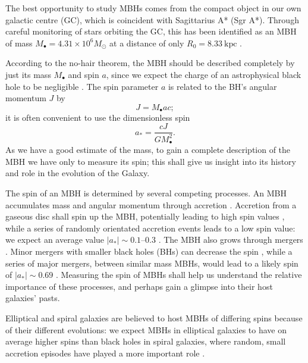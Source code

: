 \documentclass[useAMS,usedcolumn,usegraphicx,usenatbib]{mn2e}
\newcommand{\units}[1]{\ensuremath{~\mathrm{#1}}}
\begin{document}
The best opportunity to study MBHs comes from the compact object in our own galactic centre (GC), which is coincident with Sagittarius A* (Sgr A*). Through careful monitoring of stars orbiting the GC, this has been identified as an MBH of mass $M_\bullet = 4.31 \times 10^6 M_\odot$ at a distance of only $R_0 = 8.33\units{kpc}$ \citep{Gillessen2009}.

According to the no-hair theorem, the MBH should be described completely by just its mass $M_\bullet$ and spin $a$, since we expect the charge of an astrophysical black hole to be negligible \citep{Israel1967, Israel1968, Carter1971, Hawking1972, Robinson1975, Chandrasekhar1998}. The spin parameter $a$ is related to the BH's angular momentum $J$ by
\begin{equation}
J = M_\bullet ac;
\end{equation}
it is often convenient to use the dimensionless spin
\begin{equation}
a_\ast = \frac{cJ}{GM_\bullet^2}.
\end{equation}
As we have a good estimate of the mass, to gain a complete description of the MBH we have only to measure its spin; this shall give us insight into its history and role in the evolution of the Galaxy.

The spin of an MBH is determined by several competing processes. An MBH accumulates mass and angular momentum through accretion \citep{Volonteri2010}. Accretion from a gaseous disc shall spin up the MBH, potentially leading to high spin values \citep{Volonteri2005}, while a series of randomly orientated accretion events leads to a low spin value: we expect an average value $|a_\ast| \sim 0.1$--$0.3$ \citep*{King2006, King2008}. The MBH also grows through mergers \citep{Yu2002, Malbon2007}. Minor mergers with smaller black holes (BHs) can decrease the spin \citep*{Hughes2003, Gammie2004}, while a series of major mergers, between similar mass MBHs, would lead to a likely spin of $|a_\ast| \sim 0.69$ \citep{Berti2008, Berti2007, Gonzalez2007}. Measuring the spin of MBHs shall help us understand the relative importance of these processes, and perhaps gain a glimpse into their host galaxies' pasts.

Elliptical and spiral galaxies are believed to host MBHs of differing spins because of their different evolutions: we expect MBHs in elliptical galaxies to have on average higher spins than black holes in spiral galaxies, where random, small accretion episodes have played a more important role \citep*{Volonteri2007, Sikora2007}.
\end{document}

